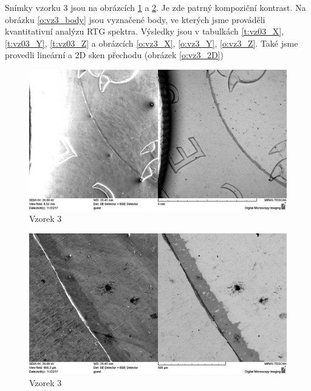 Snímky vzorku 3 jsou na obrázcích \ref{o:vz3_01} a \ref{o:vz3_02}. Je zde patrný kompoziční kontrast.
Na obrázku \ref{o:vz3_body} jsou vyznačené body, ve kterých jsme prováděli kvantitativní analýzu RTG spektra. Výsledky jsou v tabulkách \ref{t:vz03_X}, \ref{t:vz03_Y}, \ref{t:vz03_Z} a obrázcích \ref{o:vz3_X}, \ref{o:vz3_Y}, \ref{o:vz3_Z}. Také jsme provedli lineární a 2D sken přechodu (obrázek \ref{o:vz3_2D})

\begin{figure}[htbp]
\centering
\includegraphics[width=\textwidth-2cm]{graficos/VZ03_01.png}
\caption{Vzorek 3}
\label{o:vz3_01}
\end{figure}

\begin{figure}[htbp]
\centering
\includegraphics[width=\textwidth-2cm]{graficos/VZ03_02.png}
\caption{Vzorek 3}
\label{o:vz3_02}
\end{figure}

